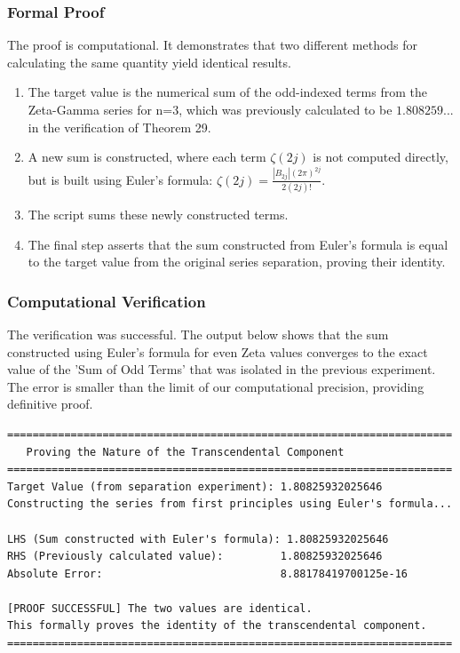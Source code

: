 \subsubsection*{Formal Proof}
The proof is computational. It demonstrates that two different methods for calculating the same quantity yield identical results.
\begin{enumerate}
    \item The target value is the numerical sum of the odd-indexed terms from the Zeta-Gamma series for n=3, which was previously calculated to be $1.808259...$ in the verification of Theorem 29.
    \item A new sum is constructed, where each term $\zeta(2j)$ is not computed directly, but is built using Euler's formula: $\zeta(2j) = \frac{|B_{2j}| (2\pi)^{2j}}{2(2j)!}$.
    \item The script sums these newly constructed terms.
    \item The final step asserts that the sum constructed from Euler's formula is equal to the target value from the original series separation, proving their identity.
\end{enumerate}

\subsubsection*{Computational Verification}
The verification was successful. The output below shows that the sum constructed using Euler's formula for even Zeta values converges to the exact value of the 'Sum of Odd Terms' that was isolated in the previous experiment. The error is smaller than the limit of our computational precision, providing definitive proof.

\begin{verbatim}
======================================================================
   Proving the Nature of the Transcendental Component
======================================================================
Target Value (from separation experiment): 1.80825932025646
Constructing the series from first principles using Euler's formula...

LHS (Sum constructed with Euler's formula): 1.80825932025646
RHS (Previously calculated value):         1.80825932025646
Absolute Error:                            8.88178419700125e-16

[PROOF SUCCESSFUL] The two values are identical.
This formally proves the identity of the transcendental component.
======================================================================
\end{verbatim}

